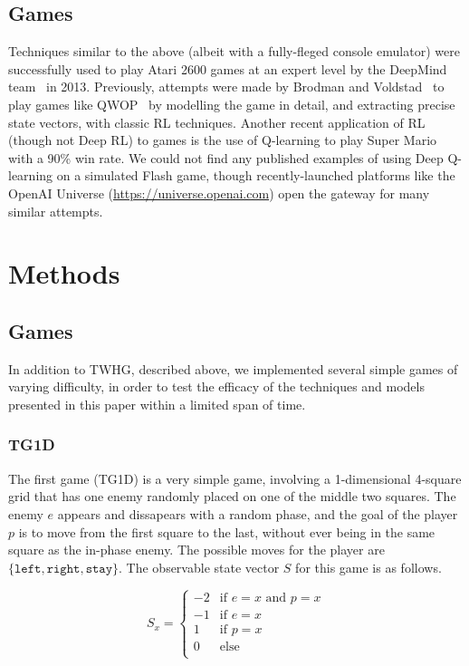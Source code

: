 \documentclass[12pt]{article}
\begin{document}
\subsection{Games}

Techniques similar to the above (albeit with a fully-fleged console emulator) were successfully used to play Atari 2600 games at an expert level by the DeepMind team~\cite{deepmind} in 2013. Previously, attempts were made by Brodman and Voldstad~\cite{Brodman2012QwopL} to play games like QWOP~\cite{qwop} by modelling the game in detail, and extracting precise state vectors, with classic RL techniques. Another recent application of RL (though not Deep RL) to games is the use of Q-learning to play Super Mario with a 90\% win rate\cite{Liao2012Cs229FR}. We could not find any published examples of using Deep Q-learning on a simulated Flash game, though recently-launched platforms like the OpenAI Universe (\url{https://universe.openai.com}) open the gateway for many similar attempts.

\section{Methods}

\subsection{Games}

In addition to TWHG, described above, we implemented several simple games of varying difficulty, in order to test the efficacy of the techniques and models presented in this paper within a limited span of time.

\subsubsection{TG1D}

The first game (TG1D) is a very simple game, involving a 1-dimensional 4-square grid that has one enemy randomly placed on one of the middle two squares. The enemy $e$ appears and dissapears with a random phase, and the goal of the player $p$ is to move from the first square to the last, without ever being in the same square as the in-phase enemy. The possible moves for the player are $\{\texttt{left}, \texttt{right}, \texttt{stay}\}$. The observable state vector $S$ for this game is as follows.

\[S_{x} =
\begin{cases}
  -2 & \text{if } e = x \text{ and } p = x \\
  -1 & \text{if } e = x \\
  1 & \text{if }  p = x \\
  0 & \text{else} \\
\end{cases}
\]
\end{document}
